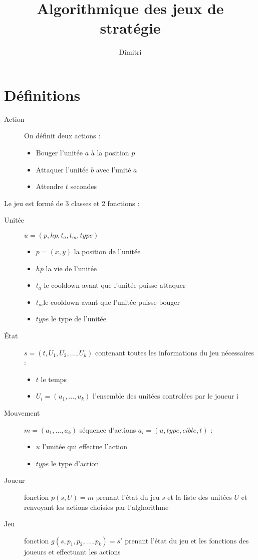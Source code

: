 \documentclass[a4paper, 11pt]{article}
\theoremstyle{definition}
\begin{document}
\title{Algorithmique des jeux de stratégie}
\author{Dimitri }

\section*{Définitions}
\begin{description}
    \item[Action] On définit deux actions : 
    \begin{itemize}
        \item Bouger l'unitée $a$ à la position $p$
        \item Attaquer l'unitée $b$ avec l'unité $a$
        \item Attendre $t$ secondes
    \end{itemize} 
\end{description}

Le jeu est formé de 3 classes et 2 fonctions :

\begin{description}
    \item[Unitée] $u = (p, hp, t_a, t_m, type)$
    \begin{itemize}
        \item $p = (x,y)$ la position de l'unitée
        \item $hp$ la vie de l'unitée
        \item $t_a$ le cooldown avant que l'unitée puisse attaquer
        \item $t_m$le cooldown avant que l'unitée puisse bouger
        \item $type$ le type de l'unitée
    \end{itemize} 
    \item[État] $s = (t, U_1, U_2, ..., U_k)$ contenant toutes les informations du jeu nécessaires :
    \begin{itemize}
        \item $t$ le temps
        \item $U_i = (u_1,...,u_k)$ l'ensemble des unitées controlées par le joueur i
    \end{itemize} 
    \item[Mouvement] $m= ( a_1,..., a_k )$ séquence d'actions $a_i = (u, type, cible, t)$ :
    \begin{itemize}
        \item $u$ l'unitée qui effectue l'action
        \item $type$ le type d'action
    \end{itemize}
    \item[Joueur] fonction $p(s,U) = m$ prenant l'état du jeu $s$ et la liste des unitées $U$
    et renvoyant les actions choisies par l'alghorithme
    \item[Jeu] fonction $g(s, p_1, p_2, ..., p_k) = s'$ prenant l'état du jeu et
    les fonctions des joueurs et effectuant les actions
\end{description}
\end{document}
